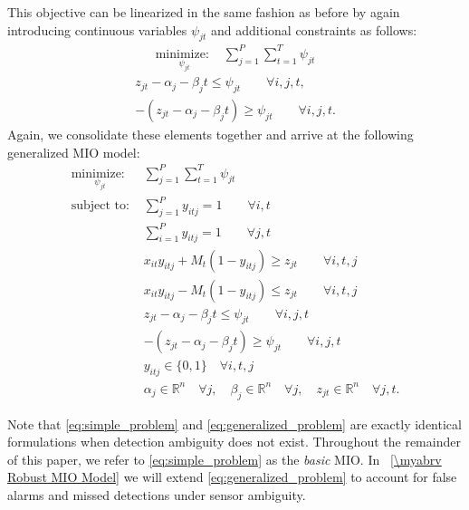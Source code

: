 This objective can be linearized in the same fashion as before by again introducing continuous variables $\psi_{jt}$ and additional constraints as follows:
\begin{align}\label{eq:generalized_linear_objective}
\underset{\psi_{jt}}{\text{minimize: }} & \sum_{j=1}^{P} \sum_{t=1}^{T} \psi_{jt}
\end{align}
\begin{align}
z_{jt} - \alpha_{j} - \beta_{j}t \leq \psi_{jt} \qquad \forall i,j,t,\\
-(z_{jt} - \alpha_{j} - \beta_{j}t) \geq \psi_{jt} \qquad \forall i,j,t.
\end{align}
Again, we consolidate these elements together and arrive at the following generalized MIO model:
\begin{align}
\underset{\psi_{jt}}{\text{minimize: }} & \sum_{j=1}^{P} \sum_{t=1}^{T} \psi_{jt} \label{eq:generalized_problem}\\
\text{subject to: }	& \sum_{j=1}^{P} y_{itj} = 1 \qquad \forall i,t\nonumber\\
				& \sum_{i=1}^{P} y_{itj} = 1 \qquad \forall j,t\nonumber\\
				& x_{it}y_{itj} + M_{t}(1-y_{itj}) \geq z_{jt} \qquad \forall i,t,j\nonumber\\
				& x_{it}y_{itj} - M_{t}(1-y_{itj}) \leq z_{jt} \qquad \forall i,t,j\nonumber\\
				& z_{jt} - \alpha_{j} - \beta_{j}t \leq \psi_{jt} \qquad \forall i,j,t\nonumber\\
				& -(z_{jt} - \alpha_{j} - \beta_{j}t) \geq \psi_{jt} \qquad \forall i,j,t\nonumber\\
			 	& y_{itj} \in \{0,1\} \quad \forall i,t,j\nonumber\\
				& \alpha_{j} \in \mathbb{R}^n \quad \forall j,\quad \beta_{j} \in \mathbb{R}^n \quad \forall j, \quad z_{jt} \in \mathbb{R}^n \quad \forall j,t.\nonumber
\end{align}

Note that \eqref{eq:simple_problem} and \eqref{eq:generalized_problem} are exactly identical formulations when detection ambiguity does not exist. Throughout the remainder of this paper, we refer to \eqref{eq:simple_problem} as the \textit{basic} MIO. In \mysection~\ref{\myabrv Robust MIO Model} we will extend \eqref{eq:generalized_problem} to account for false alarms and missed detections under sensor ambiguity. 